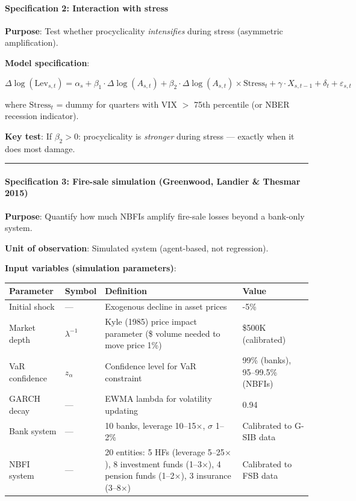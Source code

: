 \documentclass[11pt,a4paper]{article}
\begin{document}
\paragraph{Specification 2: Interaction with stress}

\textbf{Purpose}: Test whether procyclicality \textit{intensifies} during stress (asymmetric amplification).

\textbf{Model specification}:

\[\Delta \log(\text{Lev}_{s,t}) = \alpha_s + \beta_1 \cdot \Delta \log(A_{s,t}) + \beta_2 \cdot \Delta \log(A_{s,t}) \times \text{Stress}_t + \gamma \cdot X_{s,t-1} + \delta_t + \varepsilon_{s,t}\]

where $\text{Stress}_t$ = dummy for quarters with VIX $>$ 75th percentile (or NBER recession indicator).

\textbf{Key test}: If $\beta_2 > 0$: procyclicality is \textit{stronger} during stress --- exactly when it does most damage.


\bigskip\noindent\rule{\textwidth}{0.4pt}\bigskip


\paragraph{Specification 3: Fire-sale simulation (Greenwood, Landier \& Thesmar 2015)}

\textbf{Purpose}: Quantify how much NBFIs amplify fire-sale losses beyond a bank-only system.

\textbf{Unit of observation}: Simulated system (agent-based, not regression).

\textbf{Input variables (simulation parameters)}:


{\small
\begin{longtable}{|p{}|p{}|p{}|p{}|}
\hline
\textbf{Parameter} & \textbf{Symbol} & \textbf{Definition} & \textbf{Value} \\
\hline
\endhead
Initial shock & --- & Exogenous decline in asset prices & -5\% \\
\hline
Market depth & $\lambda^{-1}$ & Kyle (1985) price impact parameter (\$ volume needed to move price 1\%) & \$500K (calibrated) \\
\hline
VaR confidence & $z_\alpha$ & Confidence level for VaR constraint & 99\% (banks), 95--99.5\% (NBFIs) \\
\hline
GARCH decay & --- & EWMA lambda for volatility updating & 0.94 \\
\hline
Bank system & --- & 10 banks, leverage 10--15$\times$, $\sigma$ 1--2\% & Calibrated to G-SIB data \\
\hline
NBFI system & --- & 20 entities: 5 HFs (leverage 5--25$\times$), 8 investment funds (1--3$\times$), 4 pension funds (1--2$\times$), 3 insurance (3--8$\times$) & Calibrated to FSB data \\
\hline
\end{longtable}
}
\end{document}

